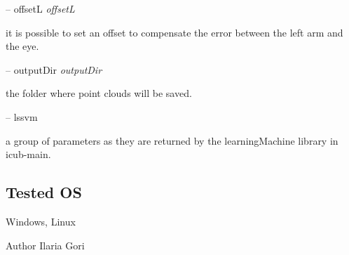 -- offsetL {\itshape offsetL} 
\begin{DoxyItemize}
\item it is possible to set an offset to compensate the error between the left arm and the eye.
\end{DoxyItemize}

-- output\+Dir {\itshape output\+Dir} 
\begin{DoxyItemize}
\item the folder where point clouds will be saved.
\end{DoxyItemize}

-- lssvm {\itshape } 
\begin{DoxyItemize}
\item a group of parameters as they are returned by the learning\+Machine library in icub-\/main.
\end{DoxyItemize}\hypertarget{group__handIKModule_tested_os_sec}{}\subsection{Tested OS}\label{group__handIKModule_tested_os_sec}
Windows, Linux

\begin{DoxyAuthor}{Author}
Ilaria Gori 
\end{DoxyAuthor}
